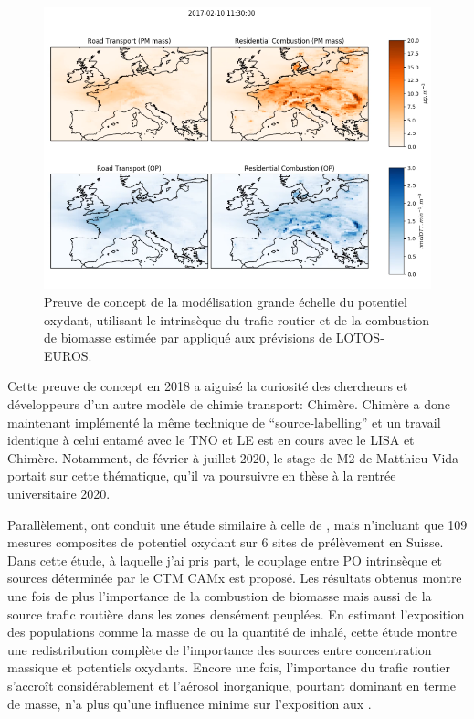 \begin{figure}[ht]
    \centering
    \includegraphics[width=0.8\linewidth]{figures/chapter05/OPmap.png}
    \caption{Preuve de concept de la modélisation grande échelle du potentiel oxydant,
    utilisant le \PODTT{} intrinsèque du trafic routier et de la combustion de biomasse
estimée par \cite{weberSourceinprep.} appliqué aux prévisions de LOTOS-EUROS.}%
    \label{fig:OPmap}
\end{figure}

Cette preuve de concept en 2018 a aiguisé la curiosité des chercheurs et développeurs
d'un autre modèle de chimie transport: Chimère. Chimère a donc maintenant implémenté la
même technique de ``source-labelling'' et un travail identique à celui entamé avec le TNO
et LE est en cours avec le LISA et Chimère. Notamment, de février à juillet 2020, le
stage de M2 de Matthieu Vida portait sur cette thématique, qu'il va poursuivre en thèse à
la rentrée universitaire 2020.

Parallèlement, \cite{daellenbachSourcessubmitted} ont conduit une étude similaire à celle
de \cite{weberSourceinprep.}, mais n'incluant que 109 mesures composites de potentiel
oxydant sur 6 sites de prélèvement en Suisse. Dans cette étude, à laquelle j'ai pris
part, le couplage entre PO intrinsèque et sources déterminée par le CTM CAMx est proposé.
Les résultats obtenus montre une fois de plus
l'importance de la combustion de biomasse mais aussi de la source trafic routière dans
les zones densément peuplées. En estimant l'exposition des populations comme la masse de
\PMdix{} ou la quantité de \POv{} inhalé, cette étude montre une
redistribution complète de l'importance des sources entre concentration massique et
potentiels oxydants. Encore une fois, l'importance du trafic routier s'accroît
considérablement et l'aérosol inorganique, pourtant dominant en terme de masse, n'a plus
qu'une influence minime sur l'exposition aux \POv.

